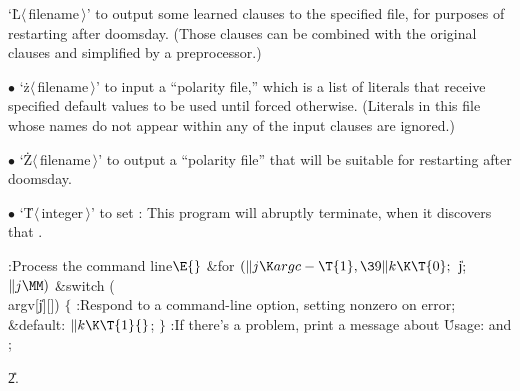 `\.L$\langle\,$filename$\,\rangle$' to output some learned clauses
to the specified file, for purposes of restarting after doomsday. (Those
clauses can be combined with the original clauses and simplified by
a preprocessor.)
\item{$\bullet$}
`\.z$\langle\,$filename$\,\rangle$' to input a ``polarity file,'' which is
a list of literals that receive specified default values to be used
until forced otherwise. (Literals in this file whose names do not appear
within any of the input clauses are ignored.)
\item{$\bullet$}
`\.Z$\langle\,$filename$\,\rangle$' to output a ``polarity file'' that will
be suitable for restarting after doomsday.
\item{$\bullet$}
`\.T$\langle\,$integer$\,\rangle$' to set : This program will
abruptly terminate, when it discovers that .

\Y\B\4:Process the command line\X${}\E{}$\6
\&{for} ${}(\|j\K\\{argc}-\T{1},\39\|k\K\T{0};{}$ \|j; ${}\|j\MM){}$\1\6
\&{switch} (\\{argv}[\|j][])\5
${}\{{}$\1\6
:Respond to a command-line option, setting  nonzero on error\X;\6
\4\&{default}:\5
${}\|k\K\T{1}{}$;\6
\4${}\}{}$\2\2\6
:If there's a problem, print a message about \.{Usage:} and \X;%
\par
\U2.\fi

